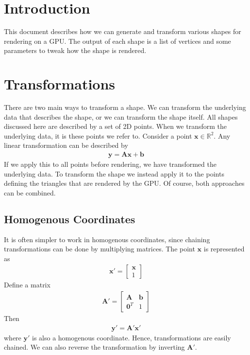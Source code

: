 \documentclass[11pt,a4paper]{article}
\begin{document}
\usetikzlibrary{math}

\section{Introduction}
This document describes how we can generate and transform
various shapes for rendering on a GPU. The output of each
shape is a list of vertices and some parameters to tweak
how the shape is rendered.

\section{Transformations}
There are two main ways to transform a shape. We can transform
the underlying data that describes the shape, or we can transform
the shape itself. All shapes discussed here are described by a set
of 2D points. When we transform the underlying data, it is these
points we refer to. Consider a point $\mathbf{x} \in \mathbb{R}^2$.
Any linear transformation can be described by
%
\begin{align}
  \mathbf{y} = \mathbf{A} \mathbf{x} + \mathbf{b}
\end{align}
%
If we apply this to all points before rendering, we have
transformed the underlying data. To transform the shape
we instead apply it to the points defining the triangles
that are rendered by the GPU. Of course, both approaches
can be combined.

\subsection{Homogenous Coordinates}
It is often simpler to work in homogenous coordinates,
since chaining transformations can be done by multiplying
matrices. The point $\mathbf{x}$ is represented as
%
\begin{align}
  \mathbf{x}' = \begin{bmatrix} \mathbf{x} \\ 1 \end{bmatrix}
\end{align}
%
Define a matrix
%
\begin{align}
  \mathbf{A}' = \begin{bmatrix}
    \mathbf{A} & \mathbf{b} \\
    \mathbf{0}^T & 1
    \end{bmatrix}
\end{align}
%
Then
%
\begin{align}
  \mathbf{y}' = \mathbf{A}' \mathbf{x}'
\end{align}
%
where $\mathbf{y}'$ is also a homogenous coordinate. Hence,
transformations are easily chained. We can also reverse the
transformation by inverting $\mathbf{A}'$.
\end{document}
